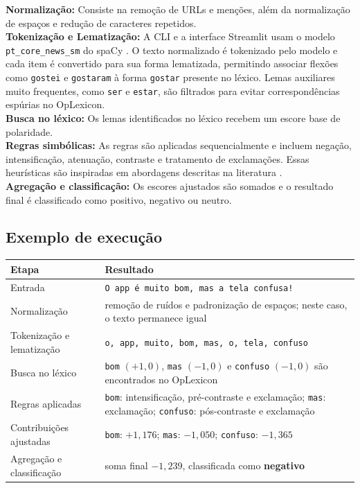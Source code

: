 \documentclass[11pt,a4paper]{article}
\begin{document}
\textbf{Normalização:}
Consiste na remoção de URLs e menções, além da normalização de espaços e redução de caracteres repetidos.\\

\textbf{Tokenização e Lematização:}
A CLI e a interface Streamlit usam o modelo \texttt{pt\_core\_news\_sm} do spaCy \citep{spacyModels}. O texto normalizado é tokenizado pelo modelo e cada item é convertido para sua forma lematizada, permitindo associar flexões como \texttt{gostei} e \texttt{gostaram} à forma \texttt{gostar} presente no léxico. Lemas auxiliares muito frequentes, como \texttt{ser} e \texttt{estar}, são filtrados para evitar correspondências espúrias no OpLexicon.\\

\textbf{Busca no léxico:}
Os lemas identificados no léxico recebem um escore base de polaridade.\\

\textbf{Regras simbólicas:}
As regras são aplicadas sequencialmente e incluem negação, intensificação, atenuação, contraste e tratamento de exclamações. Essas heurísticas são inspiradas em abordagens descritas na literatura \citep{hutto2014vader,kiritchenko2016effect}.\\

\textbf{Agregação e classificação:}
Os escores ajustados são somados e o resultado final é classificado como positivo, negativo ou neutro.

\subsection{Exemplo de execução}

\begin{center}
\small
\begin{tabularx}{\linewidth}{@{}lY@{}}
\toprule
\textbf{Etapa} & \textbf{Resultado} \\
\midrule
Entrada & \texttt{O app é muito bom, mas a tela confusa!} \\
Normalização & remoção de ruídos e padronização de espaços; neste caso, o texto permanece igual \\
Tokenização e lematização & \texttt{o, app, muito, bom, mas, o, tela, confuso} \\
Busca no léxico & \texttt{bom} $(+1{,}0)$, \texttt{mas} $(-1{,}0)$ e \texttt{confuso} $(-1{,}0)$ são encontrados no OpLexicon \\
Regras aplicadas & \texttt{bom}: intensificação, pré-contraste e exclamação; \texttt{mas}: exclamação; \texttt{confuso}: pós-contraste e exclamação \\
Contribuições ajustadas & \texttt{bom}: $+1{,}176$; \texttt{mas}: $-1{,}050$; \texttt{confuso}: $-1{,}365$ \\
Agregação e classificação & soma final $-1{,}239$, classificada como \textbf{negativo} \\
\bottomrule
\end{tabularx}
\end{center}
\end{document}
